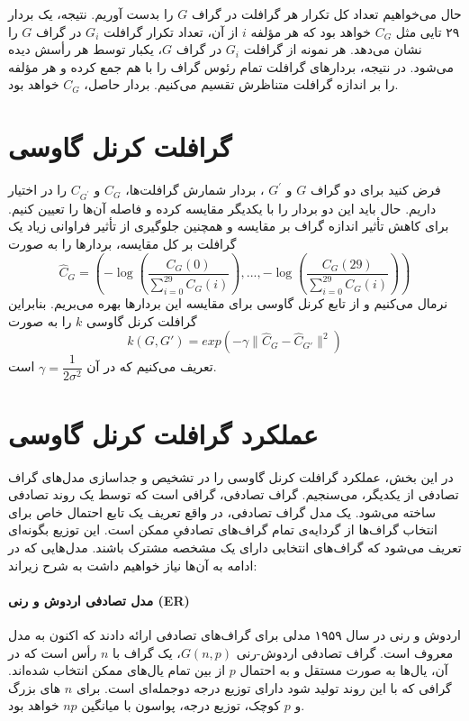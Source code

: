 حال می‌خواهیم تعداد کل تکرار هر گرافلت‌ در گراف $G$ را بدست آوریم. نتیجه، یک بردار ۲۹ تایی مثل $C_G$ خواهد بود که هر مؤلفه $i$ از آن، تعداد تکرار گرافلت $G_i$ در گراف $G$ را نشان می‌دهد. هر نمونه از گرافلت $G_i$ در گراف $G$، یکبار توسط هر رأسش دیده می‌شود. در نتیجه، بردارهای گرافلت تمام رئوس گراف را با هم جمع کرده و هر مؤلفه را بر اندازه گرافلت متناظرش تقسیم می‌کنیم. بردار حاصل، $C_G$ خواهد بود.

\section{گرافلت کرنل گاوسی}
فرض کنید برای دو گراف $G$ و $G^\prime$ ، بردار شمارش گرافلت‌ها، $C_G$ و $C_{G^\prime}$ را در اختیار داریم. حال باید این دو بردار را با یکدیگر مقایسه کرده و فاصله آن‌ها را تعیین کنیم. برای کاهش تأثیر اندازه گراف‌ بر مقایسه و همچنین جلوگیری از تأثیر فراوانی زیاد یک گرافلت بر کل مقایسه، بردارها را به صورت
\begin{equation}
\label{eq:feature-vector}
\hat{C}_G = (-\log(\dfrac{C_G(0)}{\sum _{i=0}^{29} C_G(i)}),...,-\log(\dfrac{C_G(29)}{\sum _{i=0}^{29} C_G(i)}))
\end{equation}
نرمال می‌کنیم و از تابع کرنل گاوسی برای مقایسه این بردارها بهره می‌بریم. بنابراین گرافلت کرنل گاوسی $k$ را به صورت
\begin{equation}
\label{eqn:kernelfunction}
k(G,G') = exp(-\gamma\parallel \hat{C}_G - \hat{C}_{G'}\parallel^2)
\end{equation}
تعریف می‌کنیم که در آن $\gamma = \dfrac{1}{2\sigma^2}$ است.

\section{عملکرد گرافلت کرنل گاوسی}
در این بخش، عملکرد گرافلت کرنل گاوسی را در تشخیص و جداسازی مدل‌های گراف تصادفی از یکدیگر، می‌سنجیم. گراف تصادفی، گرافی است که توسط یک روند تصادفی ساخته می‌شود. یک مدل‌ گراف تصادفی، در واقع تعریف یک تابع احتمال خاص برای انتخاب گراف‌ها از گردایه‌ی تمام گراف‌های تصادفیِ ممکن است. این توزیع بگونه‌ای تعریف می‌شود که گراف‌های انتخابی دارای یک مشخصه مشترک باشند. مدل‌هایی که در ادامه به آن‌ها نیاز خواهیم داشت به شرح زیراند:

\paragraph{مدل تصادفی اردوش و رنی (ER)}
اردوش و رنی در سال ۱۹۵۹ مدلی برای گراف‌های تصادفی ارائه دادند که اکنون به مدل  معروف است. گراف تصادفی اردوش-رنی $G(n,p)$، یک گراف با $n$ رأس است که در آن، یال‌ها به صورت مستقل و به احتمال $p$ از بین تمام یال‌های ممکن انتخاب شده‌اند. گرافی که با این روند تولید شود دارای توزیع درجه دوجمله‌ای است. برای $n$ های بزرگ و $p$‌ کوچک، توزیع درجه، پواسون با میانگین $np$ خواهد بود.


